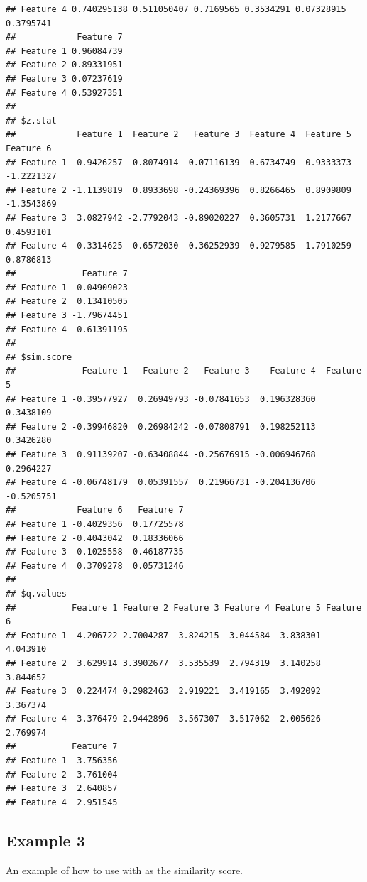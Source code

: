 \documentclass{article}\usepackage[]{graphicx}\usepackage[usenames,dvipsnames]{color}
\newenvironment{knitrout}{}{} %
\begin{document}
\begin{knitrout}
\begin{kframe}
\begin{verbatim}
## Feature 4 0.740295138 0.511050407 0.7169565 0.3534291 0.07328915 0.3795741
##            Feature 7
## Feature 1 0.96084739
## Feature 2 0.89331951
## Feature 3 0.07237619
## Feature 4 0.53927351
## 
## $z.stat
##            Feature 1  Feature 2   Feature 3  Feature 4  Feature 5  Feature 6
## Feature 1 -0.9426257  0.8074914  0.07116139  0.6734749  0.9333373 -1.2221327
## Feature 2 -1.1139819  0.8933698 -0.24369396  0.8266465  0.8909809 -1.3543869
## Feature 3  3.0827942 -2.7792043 -0.89020227  0.3605731  1.2177667  0.4593101
## Feature 4 -0.3314625  0.6572030  0.36252939 -0.9279585 -1.7910259  0.8786813
##             Feature 7
## Feature 1  0.04909023
## Feature 2  0.13410505
## Feature 3 -1.79674451
## Feature 4  0.61391195
## 
## $sim.score
##             Feature 1   Feature 2   Feature 3    Feature 4  Feature 5
## Feature 1 -0.39577927  0.26949793 -0.07841653  0.196328360  0.3438109
## Feature 2 -0.39946820  0.26984242 -0.07808791  0.198252113  0.3426280
## Feature 3  0.91139207 -0.63408844 -0.25676915 -0.006946768  0.2964227
## Feature 4 -0.06748179  0.05391557  0.21966731 -0.204136706 -0.5205751
##            Feature 6   Feature 7
## Feature 1 -0.4029356  0.17725578
## Feature 2 -0.4043042  0.18336066
## Feature 3  0.1025558 -0.46187735
## Feature 4  0.3709278  0.05731246
## 
## $q.values
##           Feature 1 Feature 2 Feature 3 Feature 4 Feature 5 Feature 6
## Feature 1  4.206722 2.7004287  3.824215  3.044584  3.838301  4.043910
## Feature 2  3.629914 3.3902677  3.535539  2.794319  3.140258  3.844652
## Feature 3  0.224474 0.2982463  2.919221  3.419165  3.492092  3.367374
## Feature 4  3.376479 2.9442896  3.567307  3.517062  2.005626  2.769974
##           Feature 7
## Feature 1  3.756356
## Feature 2  3.761004
## Feature 3  2.640857
## Feature 4  2.951545
\end{verbatim}
\end{kframe}
\end{knitrout}

\subsection{Example 3}

An example of how to use  with  as the similarity score.
\end{document}
